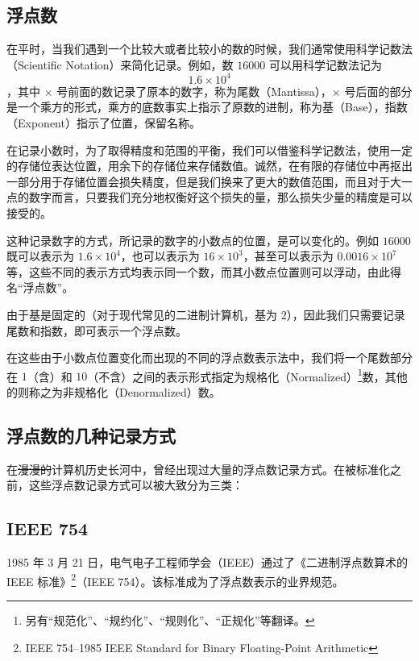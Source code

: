     \subsection{浮点数}\label{subsec:NumberSystemBasics/fixed-point-and-floating-point/floating-point}
        在平时，当我们遇到一个比较大或者比较小的数的时候，我们通常使用科学记数法（Scientific Notation）来简化记录。例如，数 $16000$ 可以用科学记数法记为
        \[1.6 \times 10^4\]
        ，其中 $\times$ 号前面的数记录了原本的数字，称为尾数（Mantissa），$\times$ 号后面的部分是一个乘方的形式，乘方的底数事实上指示了原数的进制，称为基（Base），指数（Exponent）指示了位置，保留名称。

        在记录小数时，为了取得精度和范围的平衡，我们可以借鉴科学记数法，使用一定的存储位表达位置，用余下的存储位来存储数值。诚然，在有限的存储位中再抠出一部分用于存储位置会损失精度，但是我们换来了更大的数值范围，而且对于大一点的数字而言，只要我们充分地权衡好这个损失的量，那么损失少量的精度是可以接受的。

        这种记录数字的方式，所记录的数字的小数点的位置，是可以变化的。例如 $16000$ 既可以表示为 $1.6 \times 10^4$，也可以表示为 $16 \times 10^3$，甚至可以表示为 $0.0016 \times 10^7$ 等，这些不同的表示方式均表示同一个数，而其小数点位置则可以浮动，由此得名“浮点数”。

        由于基是固定的（对于现代常见的二进制计算机，基为 $2$），因此我们只需要记录尾数和指数，即可表示一个浮点数。

        在这些由于小数点位置变化而出现的不同的浮点数表示法中，我们将一个尾数部分在 $1$（含）和 $10$（不含）之间的表示形式指定为规格化（Normalized）\footnote{另有“规范化”、“规约化”、“规则化”、“正规化”等翻译。}数，其他的则称之为非规格化（Denormalized）数。

    \subsection{浮点数的几种记录方式}\label{subsec:NumberSystemBasics/fixed-point-and-floating-point/floating-point-notations}
        在\sout{漫漫的}计算机历史长河中，曾经出现过大量的浮点数记录方式。在被标准化之前，这些浮点数记录方式可以被大致分为三类\cite{jjgsavard-2005}：

    \subsection{IEEE 754}\label{subsec:NumberSystemBasics/fixed-point-and-floating-point/ieee-754}
        1985 年 3 月 21 日，电气电子工程师学会（IEEE）通过了《二进制浮点数算术的 IEEE 标准》\footnote{IEEE 754--1985 IEEE Standard for Binary Floating-Point Arithmetic\cite{ieee754-1985}}（IEEE 754）。该标准成为了浮点数表示的业界规范。

